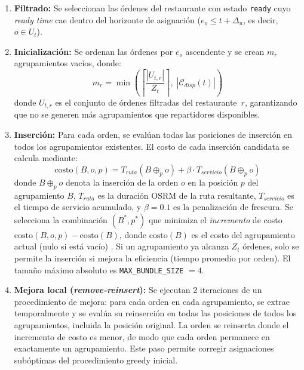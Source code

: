 \documentclass[12pt,letterpaper,oneside]{book}
\begin{document}
	\begin{enumerate}
		\item \textbf{Filtrado:} Se seleccionan las órdenes del restaurante con estado 
		\texttt{ready} cuyo \textit{ready time} cae dentro del horizonte de asignación 
		($e_o \leq t + \Delta_u$, es decir, $o \in U_t$).

		\item \textbf{Inicialización:} Se ordenan las órdenes por $e_o$ ascendente y se 
		crean $m_r$ agrupamientos vacíos, donde:
		\begin{equation}
			m_r = \min\!\left(\left\lceil \frac{|U_{t,r}|}{Z_t} \right\rceil, \; 
			|\mathcal{C}_{disp}(t)|\right)
		\end{equation}
		donde $U_{t,r}$ es el conjunto de órdenes filtradas del restaurante~$r$,
		garantizando que no se generen más agrupamientos que repartidores disponibles.

		\item \textbf{Inserción:} Para cada orden, se evalúan todas las posiciones de inserción 
		en todos los agrupamientos existentes. El costo de cada inserción candidata se calcula 
		mediante:
		\begin{equation}
			\text{costo}(B, o, p) = T_{ruta}(B \oplus_p o) + \beta \cdot T_{servicio}(B \oplus_p o)
			\label{eq:insertion_cost}
		\end{equation}
		donde $B \oplus_p o$ denota la inserción de la orden $o$ en la posición $p$ del 
		agrupamiento $B$, $T_{ruta}$ es la duración OSRM de la ruta resultante, $T_{servicio}$ 
		es el tiempo de servicio acumulado, y $\beta = 0.1$ es la penalización de frescura. Se 
		selecciona la combinación $(B^*, p^*)$ que minimiza el \emph{incremento} de costo
		$\text{costo}(B, o, p) - \text{costo}(B)$, donde $\text{costo}(B)$ es el costo del
		agrupamiento actual (nulo si está vacío) \citep{Reyes2018}. Si un agrupamiento ya 
		alcanza $Z_t$ órdenes, solo se permite la inserción si mejora la eficiencia (tiempo 
		promedio por orden). El tamaño máximo absoluto es \texttt{MAX\_BUNDLE\_SIZE} $= 4$.

		\item \textbf{Mejora local (\textit{remove-reinsert}):} Se ejecutan 2 iteraciones de 
		un procedimiento de mejora: para cada orden en cada agrupamiento, se extrae 
		temporalmente y se evalúa su reinserción en todas las posiciones de todos los 
		agrupamientos, incluida la posición original. La orden se reinserta donde el incremento
		de costo es menor, de modo que cada orden permanece en exactamente un agrupamiento.
		Este paso permite corregir asignaciones subóptimas del procedimiento greedy inicial.
	\end{enumerate}
\end{document}
